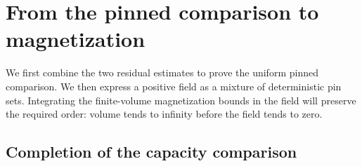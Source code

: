 \section{From the pinned comparison to magnetization}\label{sec:pressure}

We first combine the two residual estimates to prove the uniform
pinned comparison.  We then express a positive field as a mixture
of deterministic pin sets.  Integrating the finite-volume
magnetization bounds in the field will preserve the required order:
volume tends to infinity before the field tends to zero.

\subsection{Completion of the capacity comparison}

